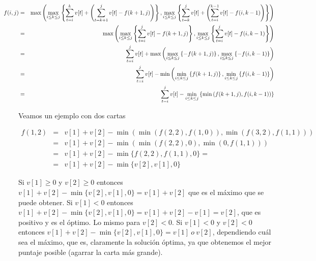 \begin{eqnarray*}\hspace*{-4cm}
  f(i,j) &=& \max\left( 
      \max_{i \leq k \leq j}\left\{ \sum_{t=i}^k v[t] + \left( \sum_{t=k+1}^{j} v[t] - f(k+1,j) \right) \right\},  
      \max_{i \leq k \leq j}\left\{ \sum_{t=k}^j v[t] + \left( \sum_{t=i}^{k-1} v[t] - f(i,k-1) \right) \right\} 
    \right) \\
    &=& \max \left(
      \max_{i \leq k \leq j}\left\{ \sum_{t=i}^j v[t] - f(k+1,j) \right\},  
      \max_{i \leq k \leq j}\left\{ \sum_{t=i}^j v[t] - f(i,k-1) \right\} 
    \right) \\
    &=& \sum_{t=i}^j v[t] + \max \left(
      \max_{i \leq k \leq j}\left\{ - f(k+1,j) \right\},  
      \max_{i \leq k \leq j}\left\{ - f(i,k-1) \right\} 
    \right) \\
    &=& \sum_{t=i}^j v[t] - \min \left(
      \min_{i \leq k \leq j}\left\{ f(k+1,j) \right\},  
      \min_{i \leq k \leq j}\left\{ f(i,k-1) \right\} 
    \right) \\
    &=& \sum_{t=i}^j v[t] - \min_{i \leq k \leq j}\left\{ \min \left( f(k+1,j), f(i,k-1) \right) \right\} 
\end{eqnarray*}

Veamos un ejemplo con dos cartas

\begin{eqnarray*}
f(1,2) &=& v[1]+v[2] - \min( \min( f(2,2), f(1,0) ), \min( f(3,2), f(1,1) ) ) \\
       &=& v[1]+v[2] - \min( \min( f(2,2), 0 ), \min( 0, f(1,1) ) ) \\
       &=& v[1]+v[2] - \min\{ f(2,2), f(1,1), 0 \} = \\
		 &=& v[1]+v[2] - \min\{ v[2], v[1], 0 \}
\end{eqnarray*}

Si $v[1] \ge 0$ y $v[2] \ge 0$ entonces $v[1]+v[2] - \min\{v[2],v[1],0\} = v[1]+v[2]$ que es el máximo que se puede obtener.
Si $v[1] < 0$ entonces $v[1]+v[2] - \min\{v[2],v[1],0\} = v[1]+v[2]-v[1]=v[2]$,
que es positivo y es el óptimo. Lo mismo para $v[2] < 0$.
Si $v[1] < 0$ y $v[2] < 0$ entonces $v[1]+v[2] - \min\{v[2],v[1],0\} = v[1] ~ o ~ v[2]$, dependiendo cuál sea el máximo, que es, claramente la solución
óptima, ya que obtenemos el mejor puntaje posible (agarrar la carta más grande).

